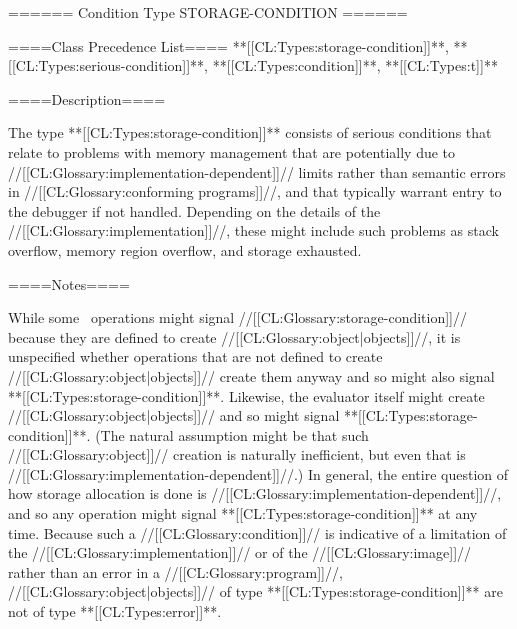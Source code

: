 ====== Condition Type STORAGE-CONDITION ======

====Class Precedence List==== **[[CL:Types:storage-condition]]**, **[[CL:Types:serious-condition]]**, **[[CL:Types:condition]]**, **[[CL:Types:t]]**

====Description====

The type **[[CL:Types:storage-condition]]** consists of serious conditions that relate to problems with memory management that are potentially due to //[[CL:Glossary:implementation-dependent]]// limits rather than semantic errors in //[[CL:Glossary:conforming programs]]//, and that typically warrant entry to the debugger if not handled. Depending on the details of the //[[CL:Glossary:implementation]]//, these might include such problems as stack overflow, memory region overflow, and storage exhausted.

====Notes====

While some \clisp\ operations might signal //[[CL:Glossary:storage-condition]]// because they are defined to create //[[CL:Glossary:object|objects]]//, it is unspecified whether operations that are not defined to create //[[CL:Glossary:object|objects]]// create them anyway and so might also signal **[[CL:Types:storage-condition]]**. Likewise, the evaluator itself might create //[[CL:Glossary:object|objects]]// and so might signal **[[CL:Types:storage-condition]]**. (The natural assumption might be that such //[[CL:Glossary:object]]// creation is naturally inefficient, but even that is //[[CL:Glossary:implementation-dependent]]//.) In general, the entire question of how storage allocation is done is //[[CL:Glossary:implementation-dependent]]//, and so any operation might signal **[[CL:Types:storage-condition]]** at any time. Because such a //[[CL:Glossary:condition]]// is indicative of a limitation of the //[[CL:Glossary:implementation]]// or of the //[[CL:Glossary:image]]// rather than an error in a //[[CL:Glossary:program]]//, //[[CL:Glossary:object|objects]]// of type **[[CL:Types:storage-condition]]** are not of type **[[CL:Types:error]]**.

